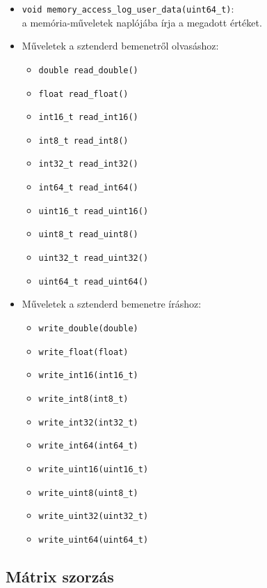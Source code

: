 \documentclass[12pt]{report}
\begin{document}
\begin{itemize}
\begin{itemize}
\item \texttt{void memory\_access\_log\_user\_data(uint64\_t)}: \\
a memória-műveletek naplójába írja a megadott értéket.

\item Műveletek a sztenderd bemenetről olvasáshoz:
\begin{itemize}
\item \texttt{double read\_double()}
\item \texttt{float read\_float()}
\item \texttt{int16\_t read\_int16()}
\item \texttt{int8\_t read\_int8()}
\item \texttt{int32\_t read\_int32()}
\item \texttt{int64\_t read\_int64()}
\item \texttt{uint16\_t read\_uint16()}
\item \texttt{uint8\_t read\_uint8()}
\item \texttt{uint32\_t read\_uint32()}
\item \texttt{uint64\_t read\_uint64()}
\end{itemize}

\item Műveletek a sztenderd bemenetre íráshoz:
\begin{itemize}
\item \texttt{write\_double(double)}
\item \texttt{write\_float(float)}
\item \texttt{write\_int16(int16\_t)}
\item \texttt{write\_int8(int8\_t)}
\item \texttt{write\_int32(int32\_t)}
\item \texttt{write\_int64(int64\_t)}
\item \texttt{write\_uint16(uint16\_t)}
\item \texttt{write\_uint8(uint8\_t)}
\item \texttt{write\_uint32(uint32\_t)}
\item \texttt{write\_uint64(uint64\_t)}
\end{itemize}
\end{itemize}
\end{itemize}

\subsection{Mátrix szorzás}
\end{document}
